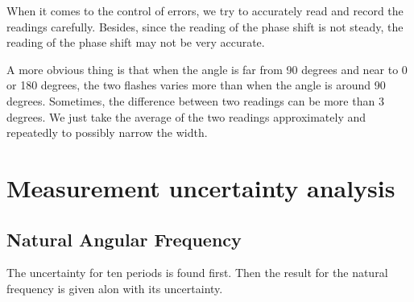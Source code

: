 \documentclass[a4paper]{report}
\begin{document}
	When it comes to the control of errors, we try to accurately read and record the readings carefully. Besides, since the reading of the phase shift is not steady, the reading of the phase shift may not be very accurate.
	
	A more obvious thing is that when the angle is far from 90 degrees and near to 0 or 180 degrees, the two flashes varies more than when the angle is around 90 degrees. Sometimes, the difference between two readings can be more than 3 degrees. We just take the average of the two readings approximately and repeatedly to possibly narrow the width.
	\newpage
	\renewcommand\thesection{\Alph{section}}
	\setcounter{section}{0}
	\section{Measurement uncertainty analysis}
	\iffalse{}
	\subsection{Natural Angular Frequency}
	The uncertainty for ten periods is found first. Then the result for the natural frequency is given alon with its uncertainty.
	
\end{document}
